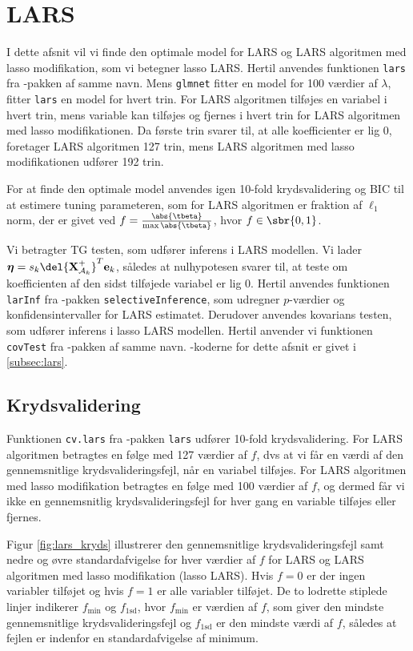 \section{LARS}
I dette afsnit vil vi finde den optimale model for LARS og LARS algoritmen med lasso modifikation, som vi betegner lasso LARS. 
Hertil anvendes funktionen \texttt{lars} fra \Rlang-pakken af samme navn.
Mens \texttt{glmnet} fitter en model for 100 værdier af \(\lambda\), fitter \texttt{lars} en model for hvert trin.
For LARS algoritmen tilføjes en variabel i hvert trin, mens variable kan tilføjes og fjernes i hvert trin for LARS algoritmen med lasso modifikationen.
Da første trin svarer til, at alle koefficienter er lig 0, foretager LARS algoritmen 127 trin, mens LARS algoritmen med lasso modifikationen udfører 192 trin.

For at finde den optimale model anvendes igen 10-fold krydsvalidering og BIC til at estimere tuning parameteren, som for LARS algoritmen er fraktion af \(\ell_1\) norm, der er givet ved \(f = \frac{\abs{\tbeta}}{\max \abs{\tbeta}}\), hvor \(f \in \sbr{0,1}\).

Vi betragter TG testen, som udfører inferens i LARS modellen.
Vi lader $\boldsymbol{\eta} = s_k \del{\textbf{X}^+_{\mathcal{A}_k}}^T \mathbf{e}_k$, således at nulhypotesen svarer til, at teste om koefficienten af den sidst tilføjede variabel er lig 0.
Hertil anvendes funktionen \texttt{larInf} fra \Rlang-pakken \texttt{selectiveInference}, som udregner \(p\)-værdier og konfidensintervaller for LARS estimatet.
Derudover anvendes kovarians testen, som udfører inferens i lasso LARS modellen.
Hertil anvender vi funktionen \texttt{covTest} fra \Rlang-pakken af samme navn. 
\Rlang-koderne for dette afsnit er givet i \ref{subsec:lars}.

\subsection{Krydsvalidering}
Funktionen \texttt{cv.lars} fra \Rlang-pakken \texttt{lars} udfører 10-fold krydsvalidering.
For LARS algoritmen betragtes en følge med 127 værdier af $f$, dvs at vi får en værdi af den gennemsnitlige krydsvalideringsfejl, når en variabel tilføjes.
For LARS algoritmen med lasso modifikation betragtes en følge med 100 værdier af $f$, og dermed får vi ikke en gennemsnitlig krydsvalideringsfejl for hver gang en variable tilføjes eller fjernes.

Figur \ref{fig:lars_kryds} illustrerer den gennemsnitlige krydsvalideringsfejl samt nedre og øvre standardafvigelse for hver værdier af $f$ for LARS og LARS algoritmen med lasso modifikation (lasso LARS).
Hvis $f = 0$ er der ingen variabler tilføjet og hvis $f=1$ er alle variabler tilføjet. 
De to lodrette stiplede linjer indikerer \(f_{\text{min}}\) og \(f_\text{1sd}\), hvor \(f_{\text{min}}\) er værdien af \(f\), som giver den mindste gennemsnitlige krydsvalideringsfejl og \(f_\text{1sd}\) er den mindste værdi af \(f\), således at fejlen er indenfor en standardafvigelse af minimum. 

